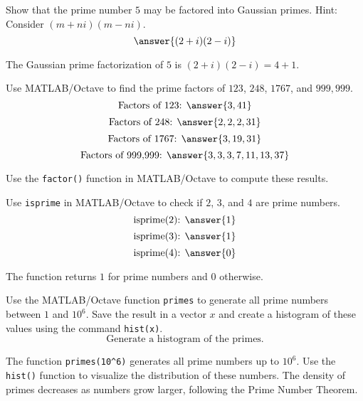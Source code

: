 \documentclass{ximera}
\author{Jont Allen}
\begin{document}
\begin{problem}
    Show that the prime number \(5\) may be factored into Gaussian primes. Hint: Consider \((m + ni)(m - ni)\).
    \[
    \answer{(2 + i)(2 - i)}
    \]
    \begin{feedback}[correct]
    The Gaussian prime factorization of \(5\) is \((2 + i)(2 - i) = 4 + 1\).
    \end{feedback}
\end{problem}

\begin{problem}
    Use MATLAB/Octave to find the prime factors of \(123\), \(248\), \(1767\), and \(999,999\).
    \[
    \text{Factors of 123: } \answer{3, 41}
    \]
    \[
    \text{Factors of 248: } \answer{2, 2, 2, 31}
    \]
    \[
    \text{Factors of 1767: } \answer{3, 19, 31}
    \]
    \[
    \text{Factors of 999,999: } \answer{3, 3, 3, 7, 11, 13, 37}
    \]
    \begin{feedback}[correct]
    Use the \texttt{factor()} function in MATLAB/Octave to compute these results.
    \end{feedback}
\end{problem}

\begin{problem}
    Use \texttt{isprime} in MATLAB/Octave to check if \(2\), \(3\), and \(4\) are prime numbers.
    \[
    \text{isprime(2): } \answer{1}
    \]
    \[
    \text{isprime(3): } \answer{1}
    \]
    \[
    \text{isprime(4): } \answer{0}
    \]
    \begin{feedback}[correct]
    The function returns \(1\) for prime numbers and \(0\) otherwise.
    \end{feedback}
\end{problem}

\begin{problem}
    Use the MATLAB/Octave function \texttt{primes} to generate all prime numbers between \(1\) and \(10^6\).
    Save the result in a vector \(x\) and create a histogram of these values using the command \texttt{hist(x)}.
    \[
    \text{Generate a histogram of the primes.}
    \]
    \begin{feedback}[correct]
    The function \texttt{primes(10^6)} generates all prime numbers up to \(10^6\). Use the \texttt{hist()} function to visualize the distribution of these numbers. The density of primes decreases as numbers grow larger, following the Prime Number Theorem.
    \end{feedback}
\end{problem}
\end{document}
